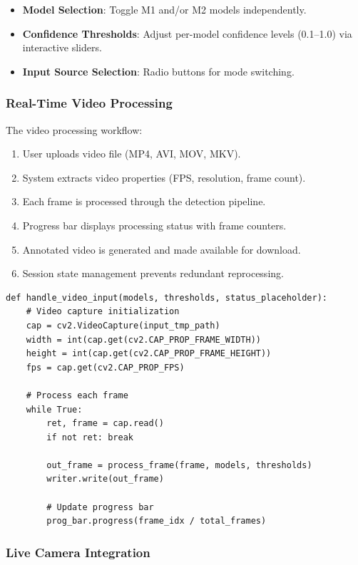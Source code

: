 \documentclass[12pt]{article}
\begin{document}
\begin{itemize}
    \item \textbf{Model Selection}: Toggle M1 and/or M2 models independently.
    \item \textbf{Confidence Thresholds}: Adjust per-model confidence levels (0.1--1.0) via interactive sliders.
    \item \textbf{Input Source Selection}: Radio buttons for mode switching.
\end{itemize}

\subsubsection*{Real-Time Video Processing}

The video processing workflow:

\begin{enumerate}
    \item User uploads video file (MP4, AVI, MOV, MKV).
    \item System extracts video properties (FPS, resolution, frame count).
    \item Each frame is processed through the detection pipeline.
    \item Progress bar displays processing status with frame counters.
    \item Annotated video is generated and made available for download.
    \item Session state management prevents redundant reprocessing.
\end{enumerate}

\begin{lstlisting}[caption={Video Processing Core Logic (Simplified)}, label={lst:video-processing}]
def handle_video_input(models, thresholds, status_placeholder):
    # Video capture initialization
    cap = cv2.VideoCapture(input_tmp_path)
    width = int(cap.get(cv2.CAP_PROP_FRAME_WIDTH))
    height = int(cap.get(cv2.CAP_PROP_FRAME_HEIGHT))
    fps = cap.get(cv2.CAP_PROP_FPS)
    
    # Process each frame
    while True:
        ret, frame = cap.read()
        if not ret: break
        
        out_frame = process_frame(frame, models, thresholds)
        writer.write(out_frame)
        
        # Update progress bar
        prog_bar.progress(frame_idx / total_frames)
\end{lstlisting}

\subsubsection*{Live Camera Integration}
\end{document}
